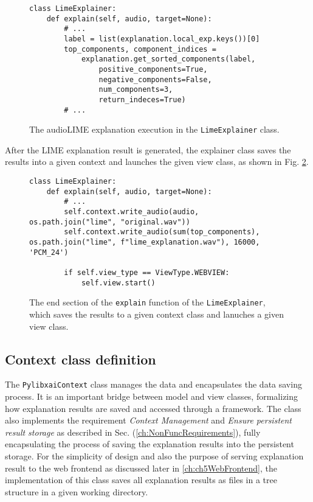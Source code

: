 \documentclass[
    bindingoffset=5mm,  %
    footnoteindent=3mm, %
    hyphenation=true    %
]{src/wut-thesis}
\begin{document}
\begin{figure}[h!]
\begin{verbatim}
class LimeExplainer:
    def explain(self, audio, target=None):
        # ...
        label = list(explanation.local_exp.keys())[0]
        top_components, component_indices =
            explanation.get_sorted_components(label,
                positive_components=True,
                negative_components=False,
                num_components=3,
                return_indeces=True)
        # ...
\end{verbatim}
\caption{The audioLIME explanation execution in the \texttt{LimeExplainer} class.}
\label{fig:LimeGetSortedComps}
\end{figure}

After the LIME explanation result is generated, the explainer class saves the results
into a given context and launches the given view class, as shown in Fig. \ref{fig:LimeSaveResults}.

\begin{figure}[h!]
\begin{verbatim}
class LimeExplainer:
    def explain(self, audio, target=None):
        # ...
        self.context.write_audio(audio, os.path.join("lime", "original.wav"))
        self.context.write_audio(sum(top_components), os.path.join("lime", f"lime_explanation.wav"), 16000, 'PCM_24')

        if self.view_type == ViewType.WEBVIEW:
            self.view.start()
\end{verbatim}
\caption{The end section of the \texttt{explain} function of the \texttt{LimeExplainer}, which saves the results to a given context class and lanuches a given view class.}
\label{fig:LimeSaveResults}
\end{figure}

\subsection{Context class definition}

The \texttt{PylibxaiContext} class manages the data and encapsulates the data saving process.
It is an important bridge between model and view classes, formalizing how explanation results
are saved and accessed through a framework.
The class also implements the requirement \textit{Context Management}
and \textit{Ensure persistent result storage} as described
in Sec. (\ref{ch:NonFuncRequirements}), fully encapsulating the process of
saving the explanation results into the persistent storage. For the simplicity of design and also the purpose of serving
explanation result to the web frontend as discussed later in \ref{ch:ch5WebFrontend},
the implementation of this class saves all explanation results as files in a tree structure in a given working directory.
\end{document}
